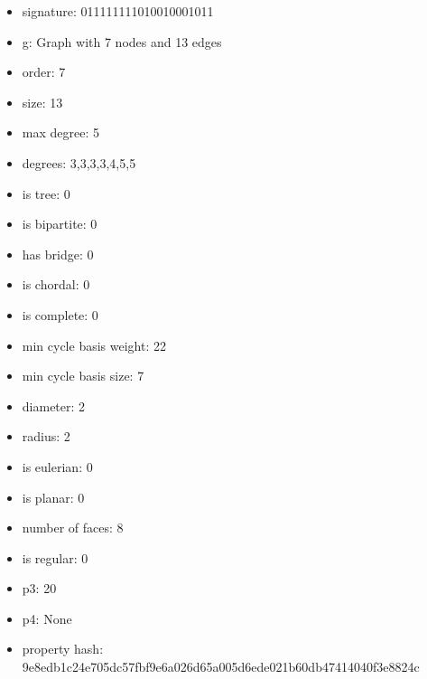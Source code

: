 \begin{itemize}
\item signature: 011111111010010001011
\item g: Graph with 7 nodes and 13 edges
\item order: 7
\item size: 13
\item max degree: 5
\item degrees: 3,3,3,3,4,5,5
\item is tree: 0
\item is bipartite: 0
\item has bridge: 0
\item is chordal: 0
\item is complete: 0
\item min cycle basis weight: 22
\item min cycle basis size: 7
\item diameter: 2
\item radius: 2
\item is eulerian: 0
\item is planar: 0
\item number of faces: 8
\item is regular: 0
\item p3: 20
\item p4: None
\item property hash: 9e8edb1c24e705dc57fbf9e6a026d65a005d6ede021b60db47414040f3e8824c
\end{itemize}
\newpage
\begin{figure}
\end{figure}
